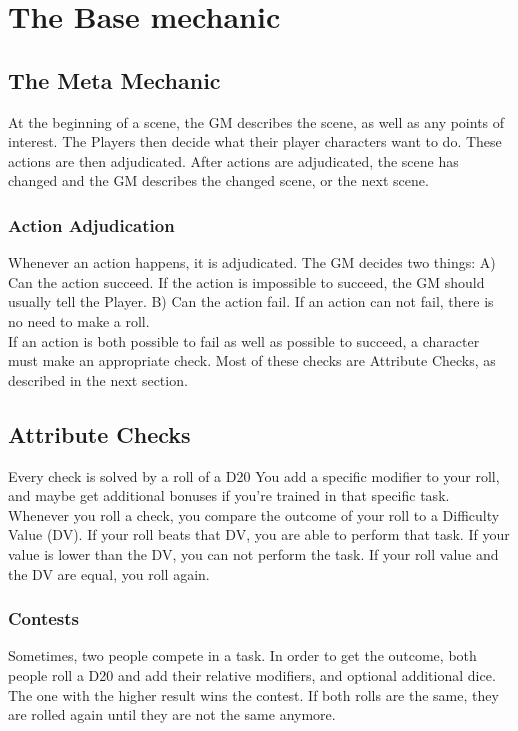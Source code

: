 \chapter{The Base mechanic}\label{ch:baseMechanic}


\section{The Meta Mechanic}\label{sec:metaMechanic}
At the beginning of a scene, the GM describes the scene, as well as any points of interest.
The Players then decide what their player characters want to do.
These actions are then adjudicated.
After actions are adjudicated, the scene has changed and the GM describes the changed scene, or the next scene.

\subsection{Action Adjudication}\label{subsec:actionAdjudication}
Whenever an action happens, it is adjudicated.
The GM decides two things: A) Can the action succeed.
If the action is impossible to succeed, the GM should usually tell the Player.
B) Can the action fail.
If an action can not fail, there is no need to make a roll.\\
If an action is both possible to fail as well as possible to succeed, a character must make an appropriate check.
Most of these checks are Attribute Checks, as described in the next section.\\


\section{Attribute Checks}\label{sec:attributeChecks}
Every check is solved by a roll of a D20 You add a specific modifier to your roll, and maybe get additional bonuses if you're trained in that specific task.
Whenever you roll a check, you compare the outcome of your roll to a Difficulty Value (DV).
If your roll beats that DV, you are able to perform that task.
If your value is lower than the DV, you can not perform the task.
If your roll value and the DV are equal, you roll again.

\subsection{Contests}\label{subsec:contests}
Sometimes, two people compete in a task.
In order to get the outcome, both people roll a D20 and add their relative modifiers, and optional additional dice.
The one with the higher result wins the contest.
If both rolls are the same, they are rolled again until they are not the same anymore.

